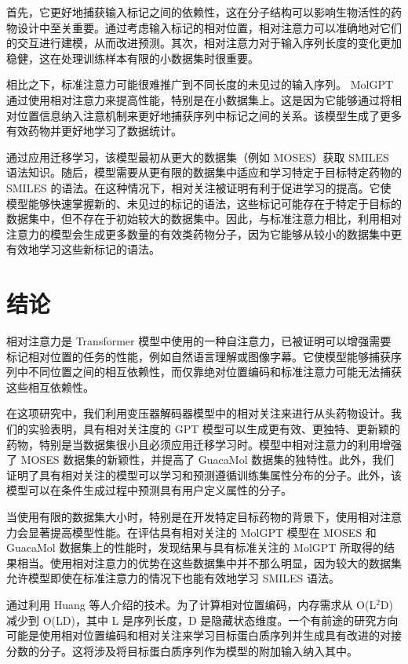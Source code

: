首先，它更好地捕获输入标记之间的依赖性，这在分子结构可以影响生物活性的药物设计中至关重要。通过考虑输入标记的相对位置，相对注意力可以准确地对它们的交互进行建模，从而改进预测。其次，相对注意力对于输入序列长度的变化更加稳健，这在处理训练样本有限的小数据集时很重要。

相比之下，标准注意力可能很难推广到不同长度的未见过的输入序列。 MolGPT 通过使用相对注意力来提高性能，特别是在小数据集上。这是因为它能够通过将相对位置信息纳入注意机制来更好地捕获序列中标记之间的关系。该模型生成了更多有效药物并更好地学习了数据统计。

通过应用迁移学习，该模型最初从更大的数据集（例如 MOSES）获取 SMILES 语法知识。随后，模型需要从更有限的数据集中适应和学习特定于目标特定药物的 SMILES 的语法。在这种情况下，相对关注被证明有利于促进学习的提高。它使模型能够快速掌握新的、未见过的标记的语法，这些标记可能存在于特定于目标的数据集中，但不存在于初始较大的数据集中。因此，与标准注意力相比，利用相对注意力的模型会生成更多数量的有效类药物分子，因为它能够从较小的数据集中更有效地学习这些新标记的语法。

\section{结论}

相对注意力是 Transformer 模型中使用的一种自注意力，已被证明可以增强需要标记相对位置的任务的性能，例如自然语言理解或图像字幕。它使模型能够捕获序列中不同位置之间的相互依赖性，而仅靠绝对位置编码和标准注意力可能无法捕获这些相互依赖性。

在这项研究中，我们利用变压器解码器模型中的相对关注来进行从头药物设计。我们的实验表明，具有相对关注度的 GPT 模型可以生成更有效、更独特、更新颖的药物，特别是当数据集很小且必须应用迁移学习时。模型中相对注意力的利用增强了 MOSES 数据集的新颖性，并提高了 GuacaMol 数据集的独特性。此外，我们证明了具有相对关注的模型可以学习和预测遵循训练集属性分布的分子。此外，该模型可以在条件生成过程中预测具有用户定义属性的分子。

当使用有限的数据集大小时，特别是在开发特定目标药物的背景下，使用相对注意力会显著提高模型性能。在评估具有相对关注的 MolGPT 模型在 MOSES 和 GuacaMol 数据集上的性能时，发现结果与具有标准关注的 MolGPT 所取得的结果相当。使用相对注意力的优势在这些数据集中并不那么明显，因为较大的数据集允许模型即使在标准注意力的情况下也能有效地学习 SMILES 语法。

通过利用 Huang 等人介绍的技术。为了计算相对位置编码，内存需求从 O(L$^2$D) 减少到 O(LD)，其中 L 是序列长度，D 是隐藏状态维度。一个有前途的研究方向可能是使用相对位置编码和相对关注来学习目标蛋白质序列并生成具有改进的对接分数的分子。这将涉及将目标蛋白质序列作为模型的附加输入纳入其中。

